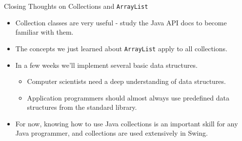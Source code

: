 \documentclass{beamer}
\begin{document}
\begin{frame}[fragile]{Closing Thoughts on Collections and {\tt ArrayList}}


\begin{itemize}
\item Collection classes are very useful - study the Java API docs to become familiar with them.
\item The concepts we just learned about {\tt ArrayList} apply to all collections.
\item In a few weeks we'll implement several basic data structures.
\begin{itemize}
\item Computer scientists need a deep understanding of data structures.
\item Application programmers should almost always use predefined data structures from the standard library.
\end{itemize}
\item For now, knowing how to use Java collections is an important skill for any Java programmer, and collections are used extensively in Swing.
\end{itemize}


\end{frame}








\end{document}
